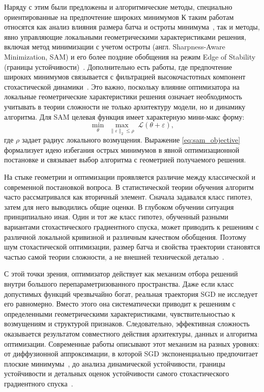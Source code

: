Наряду с этим были предложены и алгоритмические методы, специально ориентированные на предпочтение широких минимумов
К таким работам относятся как анализ влияния размера батча и остроты минимума~\cite{keskar2017largebatch}, так и методы, явно управляющие локальными геометрическими характеристиками решения, включая метод минимизации с учетом остроты (англ. Sharpness-Aware Minimization, SAM) и его более поздние обобщения на режим Edge of Stability (границы устойчивости)~\cite{foret2021sam,sam2023eos}.
Дополнительно есть работы, где предпочтение широких минимумов связывается с фильтрацией высокочастотных компонент стохастической динамики~\cite{lowpass2022flat}.
Это важно, поскольку влияние оптимизатора на локальные геометрические характеристики решения означает необходимость учитывать в теории сложности не только архитектуру модели, но и динамику алгоритма.
Для SAM целевая функция имеет характерную мини-макс форму:
\begin{equation}
\min_{\theta}\;\max_{\|\varepsilon\|_2\le \rho}\;\mathcal L(\theta+\varepsilon),
\label{eq:sam_objective}
\end{equation}
где $\rho$ задает радиус локального возмущения.
Выражение \eqref{eq:sam_objective} формализует идею избегания острых минимумов в явной оптимизационной постановке и связывает выбор алгоритма с геометрией получаемого решения.

На стыке геометрии и оптимизации проявляется различие между классической и современной постановкой вопроса.
В статистической теории обучения алгоритм часто рассматривался как вторичный элемент.
Сначала задавался класс гипотез, затем для него выводились общие оценки.
В глубоком обучении ситуация принципиально иная.
Один и тот же класс гипотез, обученный разными вариантами стохастического градиентного спуска, может приводить к решениям с различной локальной кривизной и различным качеством обобщения.
Поэтому шум стохастической оптимизации, размер батча и свойства траектории становятся частью самой теории сложности, а не внешней технической деталью~\cite{hardt2016train,bousquet2002stability}.

С этой точки зрения, оптимизатор действует как механизм отбора решений внутри большого перепараметризованного пространства.
Даже если класс допустимых функций чрезвычайно богат, реальная траектория SGD не исследует его равномерно.
Вместо этого она систематически приводит к решениям с определенными геометрическими характеристиками, чувствительностью к возмущениям и структурой признаков.
Следовательно, эффективная сложность оказывается результатом совместного действия архитектуры, данных и алгоритма оптимизации.
Современные работы описывают этот механизм на разных уровнях: от диффузионной аппроксимации, в которой SGD экспоненциально предпочитает плоские минимумы~\cite{wu2020sgdflat}, до анализа динамической устойчивости, границы устойчивости и детальных оценок устойчивости самого стохастического градиентного спуска~\cite{sgdstability2023,sgd2020stability,mei2021eos}.

